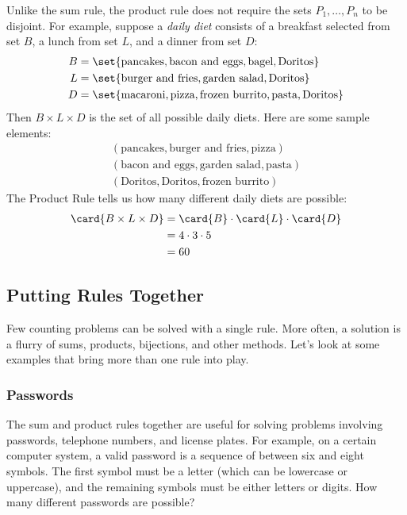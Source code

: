 Unlike the sum rule, the product rule does not require the sets $P_1,
\ldots, P_n$ to be disjoint.  For example, suppose a {\em daily diet}
consists of a breakfast selected from set $B$, a lunch from set $L$,
and a dinner from set $D$:
%
\begin{align*}
B & = \set{\text{pancakes},
      	   \text{bacon and eggs},
           \text{bagel},
           \text{Doritos}} \\
L & = \set{\text{burger and fries},
           \text{garden salad},
           \text{Doritos}} \\
D & = \set{\text{macaroni},
           \text{pizza},
           \text{frozen burrito},
           \text{pasta},
           \text{Doritos}}
\end{align*}
%
Then $B \times L \times D$ is the set of all possible daily diets.
Here are some sample elements:
%
\begin{gather*}
(\text{pancakes}, \text{burger and fries}, \text{pizza}) \\
(\text{bacon and eggs}, \text{garden salad}, \text{pasta}) \\
(\text{Doritos}, \text{Doritos}, \text{frozen burrito})
\end{gather*}
%
The Product Rule tells us how many different daily diets are possible:
%
\begin{align*}
\card{B \times L \times D}
    & = \card{B} \cdot \card{L} \cdot \card{D} \\
    & = 4 \cdot 3 \cdot 5 \\
    & = 60
\end{align*}

\subsection{Putting Rules Together}

Few counting problems can be solved with a single rule.  More often, a
solution is a flurry of sums, products, bijections, and other methods.
Let's look at some examples that bring more than one rule into play.

\subsubsection*{Passwords}

The sum and product rules together are useful for solving problems
involving passwords, telephone numbers, and license plates.  For
example, on a certain computer system, a valid password is a sequence
of between six and eight symbols.  The first symbol must be a letter
(which can be lowercase or uppercase), and the remaining symbols must
be either letters or digits.  How many different passwords are
possible?

